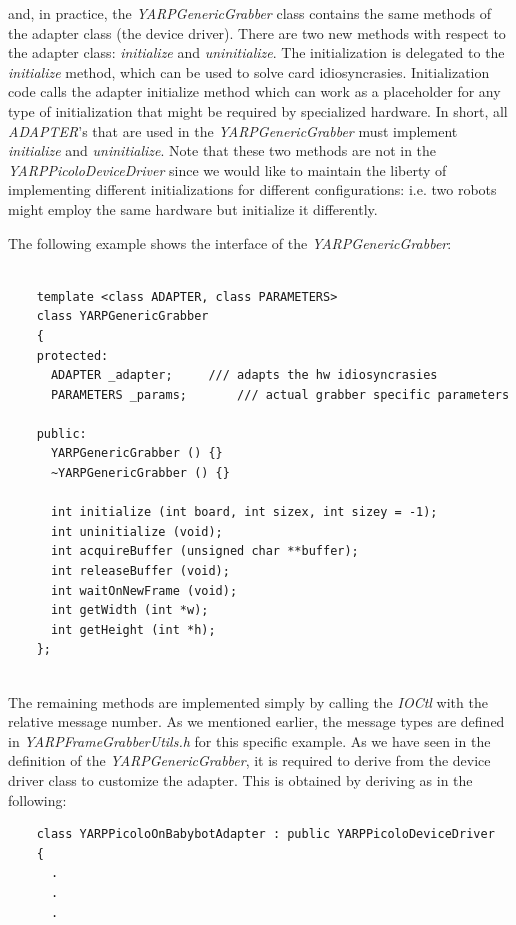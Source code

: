 \noindent and, in practice, the {\em YARPGenericGrabber} class contains the same methods of the adapter class (the device driver). There are two new methods with respect to the adapter class: {\em initialize} and {\em uninitialize}. The initialization is delegated to the {\em initialize} method, which can be used to solve card idiosyncrasies. Initialization code calls the adapter initialize method which can work as a placeholder for any type of initialization that might be required by specialized hardware. In short, all {\em ADAPTER}'s that are used in the {\em YARPGenericGrabber} must implement {\em initialize} and {\em uninitialize}. Note that these two methods are not in the {\em YARPPicoloDeviceDriver} since we would like to maintain the liberty of implementing different initializations for different configurations: i.e. two robots might employ the same hardware but initialize it differently.

The following example shows the interface of the {\em YARPGenericGrabber}:

\begin{verbatim}

    template <class ADAPTER, class PARAMETERS>
    class YARPGenericGrabber
    {
    protected:
      ADAPTER _adapter;		/// adapts the hw idiosyncrasies
      PARAMETERS _params;		/// actual grabber specific parameters

    public:
      YARPGenericGrabber () {}
      ~YARPGenericGrabber () {}

      int initialize (int board, int sizex, int sizey = -1);
      int uninitialize (void);
      int acquireBuffer (unsigned char **buffer);
      int releaseBuffer (void);
      int waitOnNewFrame (void);
      int getWidth (int *w);
      int getHeight (int *h);
    };
		
\end{verbatim}

The remaining methods are implemented simply by calling the {\em IOCtl} with the relative message number. As we mentioned earlier, the message types are defined in {\em YARPFrameGrabberUtils.h} for this specific example. As we have seen in the definition of the {\em YARPGenericGrabber}, it is required to derive from the device driver class to customize the adapter. This is obtained by deriving as in the following:

\begin{verbatim}
    class YARPPicoloOnBabybotAdapter : public YARPPicoloDeviceDriver
    {
      .
      .
      .
\end{verbatim}

